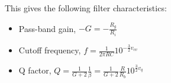 \documentclass[a4paper,11pt]{article}
\begin{document}
This gives the following filter characteristics:

\begin{itemize}
\item Pass-band gain, $-G = -\frac{R_g}{R_i}$
\item Cutoff frequency, $f = \frac{1}{2 \pi R C} 10 ^ {-\frac{3}{2} v_{cv}}$
\item Q factor, $Q = \frac{1}{G + 2} \frac{1}{\beta} = \frac{1}{G + 2} \frac{R}{R_b} 10^{\frac{3}{2} v_{q}} $

\end{itemize}
\end{document}
